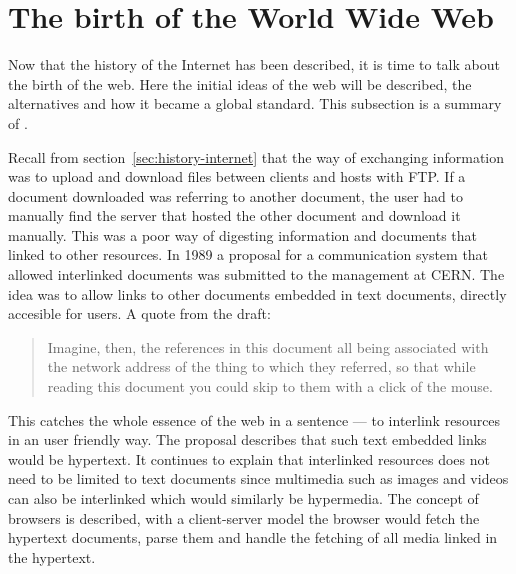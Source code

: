   \section{The birth of the World Wide Web}\label{sec:www}
    \begin{metatext}
      Now that the history of the Internet has been described, it is time to talk about the birth of the web.
      Here the initial ideas of the \gls{web} will be described, the alternatives and how it became a global standard.
      This subsection is a summary of .
    \end{metatext}


    \noindent
    Recall from section~\ref{sec:history-internet} that the way of exchanging information was to upload and download files between clients and hosts with \gls{FTP}.
    If a \gls{document} downloaded was referring to another \gls{document}, the user had to manually find the server that hosted the other \gls{document} and download it manually.
    This was a poor way of digesting information and \glspl{document} that linked to other resources.
    In 1989 a proposal for a communication system that allowed interlinked \glspl{document} was submitted to the management at \gls{CERN}.
    The idea was to allow links to other \glspl{document} embedded in text \glspl{document}, directly accesible for users.
    A quote from the draft:
    \begin{quote}
      Imagine, then, the references in this \gls{document} all being associated with the network address of the thing to which they referred, so that while reading this \gls{document} you could skip to them with a click of the mouse.
    \end{quote}
    This catches the whole essence of the \gls{web} in a sentence --- to interlink resources in an user friendly way.
    The proposal describes that such text embedded links would be \gls{hypertext}.
    It continues to explain that interlinked resources does not need to be limited to text \glspl{document} since multimedia such as images and videos can also be interlinked which would similarly be hypermedia.
    The concept of \glspl{browser} is described, with a client-server model the \gls{browser} would fetch the \gls{hypertext} \glspl{document}, parse them and handle the fetching of all media linked in the \gls{hypertext}.

